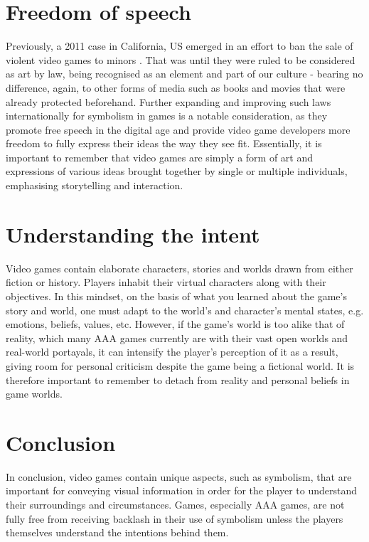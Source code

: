 \documentclass{scrartcl}
\begin{document}
\section{Freedom of speech}
Previously, a 2011 case in California, US emerged in an effort to ban the sale of violent video games to minors \cite{brownv}. That was until they were ruled to be considered as art by law, being recognised as an element and part of our culture - bearing no difference, again, to other forms of media such as books and movies that were already protected beforehand. Further expanding and improving such laws internationally for symbolism in games is a notable consideration, as they promote free speech in the digital age and provide video game developers more freedom to fully express their ideas the way they see fit. Essentially, it is important to remember that video games are simply a form of art and expressions of various ideas brought together by single or multiple individuals, emphasising storytelling and interaction. 


\section{Understanding the intent}
Video games contain elaborate characters, stories and worlds drawn from either fiction or history. Players inhabit their virtual characters along with their objectives. In this mindset, on the basis of what you learned about the game's story and world, one must adapt to the world's and character's mental states, e.g. emotions, beliefs, values, etc. However, if the game's world is too alike that of reality, which many AAA games currently are with their vast open worlds and real-world portayals, it can intensify the player's perception of it as a result, giving room for personal criticism despite the game being a fictional world. It is therefore important to remember to detach from reality and personal beliefs in game worlds.


\section{Conclusion}
In conclusion, video games contain unique aspects, such as symbolism, that are important for conveying visual information in order for the player to understand their surroundings and circumstances. Games, especially AAA games, are not fully free from receiving backlash in their use of symbolism unless the players themselves understand the intentions behind them. 





\end{document}

